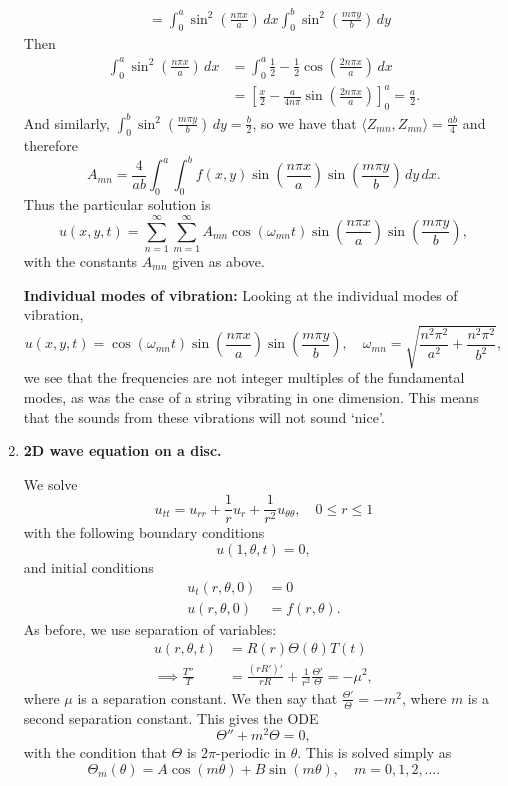 \begin{enumerate}
\begin{align*}
		&= \int_0^a \sin^2\left(\frac{n\pi x}{a}\right) \,dx \int_0^b \sin^2\left(\frac{m\pi y}{b}\right) \,dy 
	\end{align*}
	Then
	\begin{align*}
		\int_0^a \sin^2\left(\frac{n\pi x}{a}\right) \,dx &= \int_0^a \frac12 - \frac12\cos\left(\frac{2n\pi x}{a}\right) \,dx \\
		&= \left[ \frac{x}{2} - \frac{a}{4n\pi}\sin\left(\frac{2n\pi x}{a}\right) \right]_0^a = \frac{a}{2}.
	\end{align*}
	And similarly, $\int_0^b \sin^2\left(\frac{m\pi y}{b}\right) \,dy = \frac{b}{2}$, so we have that $\langle Z_{mn}, Z_{mn} \rangle = \frac{ab}{4}$ and therefore
	\begin{equation}\label{eq:wave2drectcoeff}
		A_{mn} = \frac{4}{ab} \int_0^a \int_0^b f(x,y) \sin\left(\frac{n\pi x}{a}\right) \sin\left(\frac{m\pi y}{b}\right) \,dy\,dx.
	\end{equation}
	Thus the particular solution is
	\[
	u(x,y,t) = \sum_{n=1}^{\infty} \sum_{m=1}^{\infty} A_{mn}\cos(\omega_{mn}t) \sin\left(\frac{n\pi x}{a}\right) \sin\left(\frac{m\pi y}{b}\right),
	\]
	with the constants $A_{mn}$ given as above.
	
	\textbf{Individual modes of vibration:} Looking at the individual modes of vibration,
	\[
	u(x,y,t) = \cos(\omega_{mn}t) \sin\left(\frac{n\pi x}{a}\right) \sin\left(\frac{m\pi y}{b}\right), \quad \omega_{mn} = \sqrt{\frac{n^2\pi^2}{a^2} + \frac{n^2\pi^2}{b^2}},
	\]
	we see that the frequencies are not integer multiples of the fundamental modes, as was the case of a string vibrating in one dimension. This means that the sounds from these vibrations will not sound `nice'.
	
	\item \textbf{2D wave equation on a disc.}
	
	We solve
	\[
	u_{tt} = u_{rr} + \frac{1}{r}u_r + \frac{1}{r^2}u_{\theta\theta}, \quad 0 \leq r \leq 1
	\]
	with the following boundary conditions
	\[
	u(1,\theta,t) = 0,
	\]
	and initial conditions
	\begin{align*}
		u_t(r,\theta,0) &= 0 \\
		u(r,\theta,0) &= f(r,\theta).
	\end{align*}
	As before, we use separation of variables:
	\begin{align*}
		u(r,\theta,t) &= R(r)\Theta(\theta)T(t) \\
		\implies \frac{T''}{T} &= \frac{(rR')'}{rR} + \frac{1}{r^2}\frac{\Theta'}{\Theta} = -\mu^2,
	\end{align*}
	where $\mu$ is a separation constant. We then say that $\frac{\Theta'}{\Theta} = -m^2$, where $m$ is a second separation constant. This gives the ODE
	\[
	\Theta'' + m^2\Theta = 0,
	\]
	with the condition that $\Theta$ is $2\pi$-periodic in $\theta$. This is solved simply as
	\[
	\Theta_m(\theta) = A\cos(m\theta) + B\sin(m\theta), \quad m = 0,1,2,\dots.
	\]
	

\end{enumerate}
